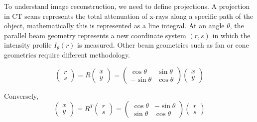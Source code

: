 \documentclass{article}
\begin{document}
To understand image reconstruction, we need to define projections. A projection in CT scans represents the total attenuation of x-rays along a specific path of the object, mathematically this is represented as a line integral. At an angle $\theta$, the parallel beam geometry represents a new coordinate system $(r, s)$ in which the intensity profile $I_\theta (r)$ is measured. Other beam geometries such as fan or cone geometries require different methodology.

$$\begin{pmatrix} r \\ s \end{pmatrix} = R \begin{pmatrix} x \\ y \end{pmatrix} = \begin{pmatrix} \cos\theta & \sin\theta \\ -\sin\theta & \cos\theta \end{pmatrix} \begin{pmatrix} x \\ y \end{pmatrix}$$

Conversely,
$$\begin{pmatrix} x \\ y \end{pmatrix} = R^T \begin{pmatrix} r \\ s \end{pmatrix} = \begin{pmatrix} \cos\theta & -\sin\theta \\ \sin\theta & \cos\theta \end{pmatrix} \begin{pmatrix} r \\ s \end{pmatrix}$$
\end{document}
